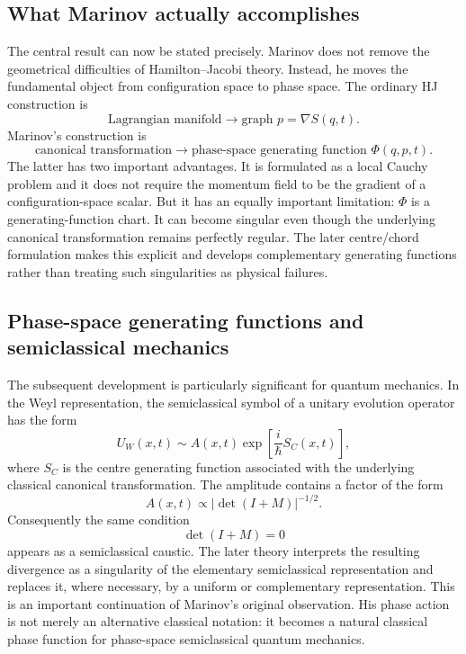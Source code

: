 \subsection{What Marinov actually accomplishes}
The central result can now be stated precisely.
Marinov does not remove the geometrical difficulties of Hamilton--Jacobi
theory.  Instead, he moves the fundamental object from configuration space
to phase space.
The ordinary HJ construction is
\begin{equation}
 \boxed{
 \text{Lagrangian manifold}
 \longrightarrow
 \text{graph }p=\nabla S(q,t).
 }
\end{equation}
Marinov's construction is
\begin{equation}
 \boxed{
 \text{canonical transformation}
 \longrightarrow
 \text{phase-space generating function }\Phi(q,p,t).
 }
\end{equation}
The latter has two important advantages.  It is formulated as a local
Cauchy problem and it does not require the momentum field to be the gradient
of a configuration-space scalar.
But it has an equally important limitation: \(\Phi\) is a generating-function
chart.  It can become singular even though the underlying canonical
transformation remains perfectly regular.
The later centre/chord formulation makes this explicit and develops
complementary generating functions rather than treating such singularities
as physical failures. \cite{OzorioBrodier2006,RiosOzorio2004}
\subsection{Phase-space generating functions and semiclassical mechanics}
The subsequent development is particularly significant for quantum
mechanics.  In the Weyl representation, the semiclassical symbol of a
unitary evolution operator has the form
\begin{equation}
 U_W(x,t)
 \sim
 A(x,t)
 \exp\left[
 \frac{i}{\hbar}S_C(x,t)
 \right],
\end{equation}
where \(S_C\) is the centre generating function associated with the underlying
classical canonical transformation.
The amplitude contains a factor of the form
\begin{equation}
 A(x,t)\propto
 \left|\det(I+M)\right|^{-1/2}.
\end{equation}
Consequently the same condition
\begin{equation}
 \det(I+M)=0
\end{equation}
appears as a semiclassical caustic.  The later theory interprets the
resulting divergence as a singularity of the elementary semiclassical
representation and replaces it, where necessary, by a uniform or
complementary representation. \cite{OzorioBrodier2006}
This is an important continuation of Marinov's original observation.  His
phase action is not merely an alternative classical notation: it becomes a
natural classical phase function for phase-space semiclassical quantum
mechanics.
